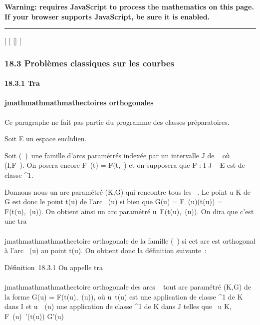\textbf{Warning: 
requires JavaScript to process the mathematics on this page.\\ If your
browser supports JavaScript, be sure it is enabled.}

\begin{center}\rule{3in}{0.4pt}\end{center}

{[}
{[}
{[}{]}
{[}

\subsubsection{18.3 Problèmes classiques sur les courbes}

\paragraph{18.3.1 Tra\\\\jmathmathmathmathectoires orthogonales}

Ce paragraphe ne fait pas partie du programme des classes préparatoires.

Soit E un espace euclidien.

Soit (\Gamma\lambda~)\lambda~\inJ une famille d'arcs paramétrés indexée
par un intervalle J de ~ où \Gamma\lambda~ = (I,F\lambda~). On posera
encore F\lambda~(t) = F(t,\lambda~) et on supposera que F : I \times J \rightarrow~ E est de
classe ^1.

Donnons nous un arc paramétré (K,G) qui rencontre tous les \Gamma\lambda~.
Le point u \in K de G est donc le point t(u) de l'arc \Gamma\lambda~(u) si
bien que G(u) = F\lambda~(u)(t(u)) = F(t(u),\lambda~(u)). On obtient ainsi
un arc paramétré u\mapsto~F(t(u),\lambda~(u)). On dira que
c'est une tra\\\\jmathmathmathmathectoire orthogonale de la famille (\Gamma\lambda~) si cet
arc est orthogonal à l'arc \Gamma\lambda~(u) au point t(u). On obtient
donc la définition suivante~:

Définition~18.3.1 On appelle tra\\\\jmathmathmathmathectoire orthogonale des arcs
\Gamma\lambda~ tout arc paramétré (K,G) de la forme G(u) = F(t(u),\lambda~(u)),
où u\mapsto~t(u) est une application de classe
^1 de K dans I et u\mapsto~\lambda~(u) une
application de classe ^1 de K dans J telles que
\forall~u \in K, F\lambda~(u)~'(t(u)) \bot G'(u)

